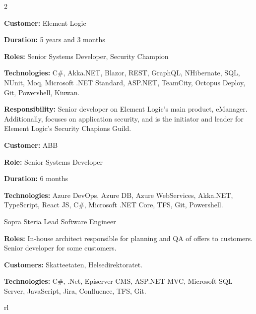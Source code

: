 \documentclass[10pt]{article} %
\begin{document}
\begin{paracol}{2}
{\textbf{}

\textbf{Customer:} Element Logic

\textbf{Duration:} 5 years and 3 months

\textbf{Roles:} Senior Systems Developer, Security Champion

\textbf{Technologies:} C\#, Akka.NET, Blazor, REST, GraphQL, NHibernate, SQL, NUnit, Moq, Microsoft .NET Standard, ASP.NET, TeamCity, Octopus Deploy, Git, Powershell, Kiuwan.
 
\textbf{Responsibility:} Senior developer on Element Logic's main product, eManager. Additionally,  focuses on application security, and is the initiator and leader for Element Logic's Security Chapions Guild.
 
\textbf{}
 
\textbf{Customer:} ABB

\textbf{Role:} Senior Systems Developer

\textbf{Duration:} 6 months

\textbf{Technologies:} Azure DevOps, Azure DB, Azure WebServices, Akka.NET, TypeScript, React JS, C\#, Microsoft .NET Core, TFS, Git, Powershell.
} 

{}
{Sopra Steria} 
{Lead Software Engineer} 
{\textbf{Roles:} In-house architect responsible for planning and QA of offers to customers. Senior developer for some customers.

\textbf{Customers:} Skatteetaten, Helsedirektoratet.

\textbf{Technologies:} C\#, .Net, Episerver CMS, ASP.NET MVC, Microsoft SQL Server, JavaScript, Jira, Confluence, TFS, Git.
} 

 

\begin{supertabular}{rl} %

\end{supertabular}


\end{paracol}
\end{document}
